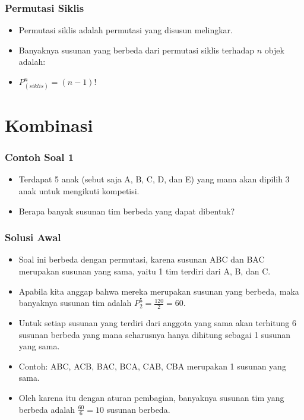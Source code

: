 \begin{frame}
\frametitle{Permutasi Siklis}
\begin{itemize}
  \item Permutasi siklis adalah permutasi yang disusun melingkar.
  \item Banyaknya susunan yang berbeda dari permutasi siklis terhadap $n$ objek adalah:
  \item $P^{n}_{(siklis)} = (n-1)!$
\end{itemize}
\end{frame}

\section{Kombinasi}
\frame{\sectionpage}

\begin{frame}
\frametitle{Contoh Soal 1}
\begin{itemize}
  \item Terdapat 5 anak (sebut saja A, B, C, D, dan E) yang mana akan dipilih 3 anak untuk mengikuti kompetisi.
  \item Berapa banyak susunan tim berbeda yang dapat dibentuk?
\end{itemize}
\end{frame}

\begin{frame}
\frametitle{Solusi Awal}
\begin{itemize}
  \item Soal ini berbeda dengan permutasi, karena susunan ABC dan BAC merupakan susunan yang sama, yaitu 1 tim terdiri dari A, B, dan C.
  \item Apabila kita anggap bahwa mereka merupakan susunan yang berbeda, maka banyaknya susunan tim adalah $P^{5}_{2} = \frac{120}{2} = 60$.
  \item Untuk setiap susunan yang terdiri dari anggota yang sama akan terhitung 6 susunan berbeda yang mana seharusnya hanya dihitung sebagai 1 susunan yang sama.
  \item Contoh: ABC, ACB, BAC, BCA, CAB, CBA merupakan 1 susunan yang sama.
  \item Oleh karena itu dengan aturan pembagian, banyaknya susunan tim yang berbeda adalah $\frac{60}{6} = 10$ susunan berbeda.
\end{itemize}
\end{frame}

